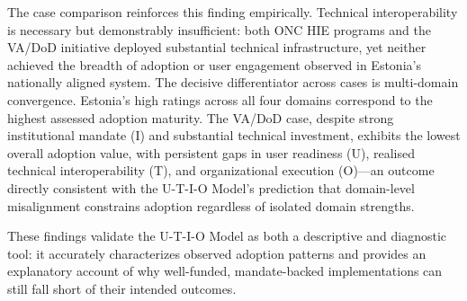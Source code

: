 The case comparison reinforces this finding empirically. Technical interoperability is necessary but demonstrably insufficient: both ONC HIE programs and the VA/DoD initiative deployed substantial technical infrastructure, yet neither achieved the breadth of adoption or user engagement observed in Estonia's nationally aligned system. The decisive differentiator across cases is multi-domain convergence. Estonia's high ratings across all four domains correspond to the highest assessed adoption maturity. The VA/DoD case, despite strong institutional mandate (I) and substantial technical investment, exhibits the lowest overall adoption value, with persistent gaps in user readiness (U), realised technical interoperability (T), and organizational execution (O)—an outcome directly consistent with the U-T-I-O Model's prediction that domain-level misalignment constrains adoption regardless of isolated domain strengths.

These findings validate the U-T-I-O Model as both a descriptive and diagnostic tool: it accurately characterizes observed adoption patterns and provides an explanatory account of why well-funded, mandate-backed implementations can still fall short of their intended outcomes.
